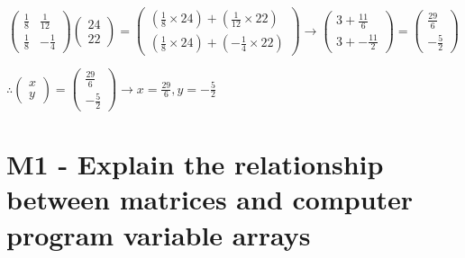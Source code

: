 \documentclass{article}
\begin{document}
\[
	\begin{pmatrix}
		\frac{1}{8} & \frac{1}{12}\\
		\frac{1}{8} & -\frac{1}{4}
	\end{pmatrix}
	\begin{pmatrix}
		24\\
		22
	\end{pmatrix}

	=
	\begin{pmatrix}
		(\frac{1}{8}\times24)+(\frac{1}{12}\times22)\\
		(\frac{1}{8}\times24)+(-\frac{1}{4}\times22)
	\end{pmatrix}
	\rightarrow
	\begin{pmatrix}
		3 + \frac{11}{6}\\
		3 + -\frac{11}{2}
	\end{pmatrix}
	=
	\begin{pmatrix}
		\frac{29}{6}\\
		-\frac{5}{2}
	\end{pmatrix}
\]
\begin{center}\vspace{0.5cm}$\therefore
	\begin{pmatrix}
		x\\
		y
	\end{pmatrix}
	= 
	\begin{pmatrix}
		\frac{29}{6}\\
		-\frac{5}{2}
	\end{pmatrix}
	\rightarrow
x = \frac{29}{6}, y = -\frac{5}{2}$\end{center}
\section{M1 - Explain the relationship between matrices and computer program variable arrays}
\end{document}

